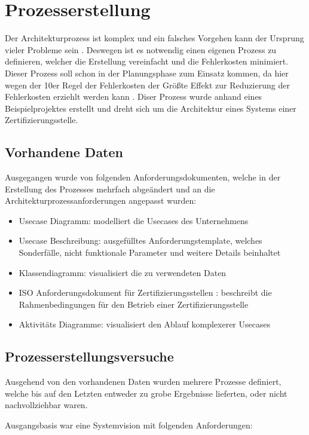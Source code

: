 \chapter{Prozesserstellung}
Der Architekturprozess ist komplex und ein falsches Vorgehen kann der Ursprung vieler Probleme sein \cite[S. 7-8]{softarch}. Deswegen ist es notwendig einen eigenen Prozess zu definieren, welcher die Erstellung vereinfacht und die Fehlerkosten minimiert. Dieser Prozess soll schon in der Planungsphase zum Einsatz kommen, da hier wegen der 10er Regel der Fehlerkosten der Größte Effekt zur Reduzierung der Fehlerkosten erziehlt werden kann \cite[S. 154]{fehler}.
Diser Prozess wurde anhand eines Beispielprojektes erstellt und dreht sich um die Architektur eines Systems einer Zertifizierungsstelle.

\section{Vorhandene Daten}
Ausgegangen wurde von folgenden Anforderungsdokumenten, welche in der Erstellung des Prozesses mehrfach abgeändert und an die Architekturprozessanforderungen angepasst wurden:

\begin{itemize}
  \item Usecase Diagramm: modelliert die Usecases des Unternehmens
  \item Usecase Beschreibung: ausgefülltes Anforderungstemplate, welches Sonderfälle, nicht funktionale Parameter und weitere Details beinhaltet
  \item Klassendiagramm: visualisiert die zu verwendeten Daten
  \item ISO Anforderungsdokument für Zertifizierungsstellen \cite{ISO_CERT}: beschreibt die Rahmenbedingungen für den Betrieb einer Zertifizierungsstelle
  \item Aktivitäts Diagramme: visualisiert den Ablauf komplexerer Usecases
\end{itemize}


\section{Prozesserstellungsversuche}
Ausgehend von den vorhandenen Daten wurden mehrere Prozesse definiert, welche bis auf den Letzten entweder zu grobe Ergebnisse lieferten, oder nicht nachvollziehbar waren.

Ausgangsbasis war eine Systemvision mit folgenden Anforderungen:

